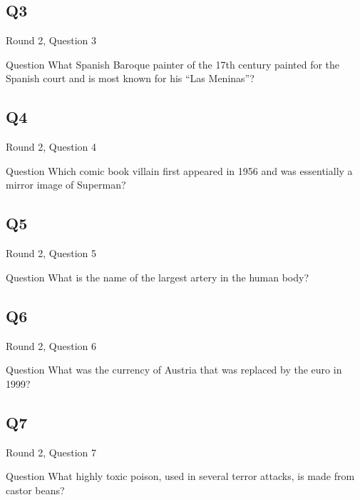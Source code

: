 \documentclass[11pt]{beamer}
\begin{document}
\subsection*{Q3}
\begin{frame}[t]{Round 2, Question 3}
\vspace{2em}
\begin{block}{Question}
What Spanish Baroque painter of the 17th century painted for the Spanish court and is most known for his ``Las Meninas''\@?
\end{block}
\end{frame}
    

\subsection*{Q4}
\begin{frame}[t]{Round 2, Question 4}
\vspace{2em}
\begin{block}{Question}
Which comic book villain first appeared in 1956 and was essentially a mirror image of Superman\@?
\end{block}
\end{frame}
    

\subsection*{Q5}
\begin{frame}[t]{Round 2, Question 5}
\vspace{2em}
\begin{block}{Question}
What is the name of the largest artery in the human body\@?
\end{block}
\end{frame}
    

\subsection*{Q6}
\begin{frame}[t]{Round 2, Question 6}
\vspace{2em}
\begin{block}{Question}
What was the currency of Austria that was replaced by the euro in 1999\@?
\end{block}
\end{frame}
    

\subsection*{Q7}
\begin{frame}[t]{Round 2, Question 7}
\vspace{2em}
\begin{block}{Question}
What highly toxic poison, used in several terror attacks, is made from castor beans\@?
\end{block}
\end{frame}
    
\end{document}
